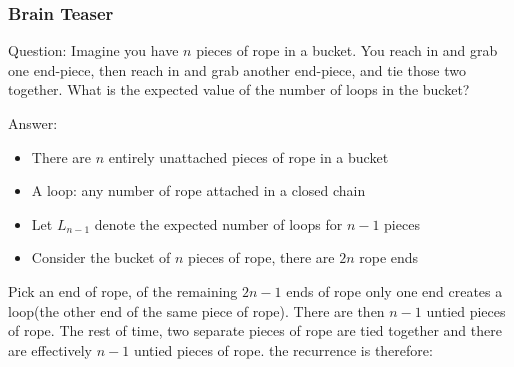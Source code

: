 \documentclass[11pt]{beamer}
\begin{document}
\begin{frame}
\frametitle{Brain Teaser}
\begin{block}{Question:}
	Imagine you have $n$ pieces of rope in a bucket. You reach in and grab one end-piece, then reach in and grab another end-piece, and tie those two together. What is the expected value of the number of loops in the bucket?
\end{block}
\begin{block}{Answer:}
	\begin{itemize}
		\item There are $n$ entirely unattached pieces of rope in a bucket
		\item A loop: any number of rope attached in a closed chain
		\item Let $L_{n-1}$ denote the expected number of loops for $n-1$ pieces
		\item Consider the bucket of $n$ pieces of rope, there are $2n$ rope ends
	\end{itemize}
Pick an end of rope, of the remaining $2n-1$ ends of rope only one end creates a loop(the other end of the same piece of rope). There are then $n-1$ untied pieces of rope. The rest of time, two separate pieces of rope are tied together and there are effectively $n-1$ untied pieces of rope. the recurrence is therefore:
\end{block}
\end{frame}
\end{document}
